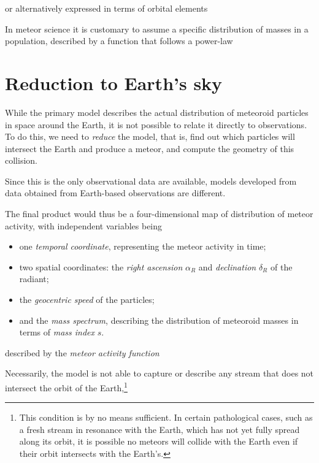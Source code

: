     or alternatively expressed in terms of orbital elements

    In meteor science it is customary to assume a specific distribution of masses in a population,
    described by a function that follows a power-law





\section{Reduction to Earth's sky} \label{ir}
    While the primary model describes the actual distribution of meteoroid particles in space around the Earth,
    it is not possible to relate it directly to observations. To do this, we need to \emph{reduce} the model,
    that is, find out which particles will intersect the Earth and produce a meteor, and compute the geometry of this collision.

    Since this is the only observational data are available,
    models developed from data obtained from Earth-based observations are different.

    The final product would thus be a four-dimensional map of distribution of meteor activity, with independent variables being
    \begin{itemize}
        \item one \emph{temporal coordinate}, representing the meteor activity in time;
        \item two spatial coordinates: the \emph{right ascension} $\alpha_R$ and \emph{declination} $\delta_R$ of the radiant;
        \item the \emph{geocentric speed} of the particles;
        \item and the \emph{mass spectrum}, describing the distribution of meteoroid masses in terms of \textit{mass index} $s$.
    \end{itemize}

    described by the \emph{meteor activity function}

    Necessarily, the model is not able to capture or describe any stream that does not intersect the orbit of the
    Earth,\footnote{This condition is by no means sufficient. In certain pathological cases, such as a fresh stream in resonance
    with the Earth, which has not yet fully spread along its orbit, it is possible no meteors will collide with the Earth even
    if their orbit intersects with the Earth's.}

